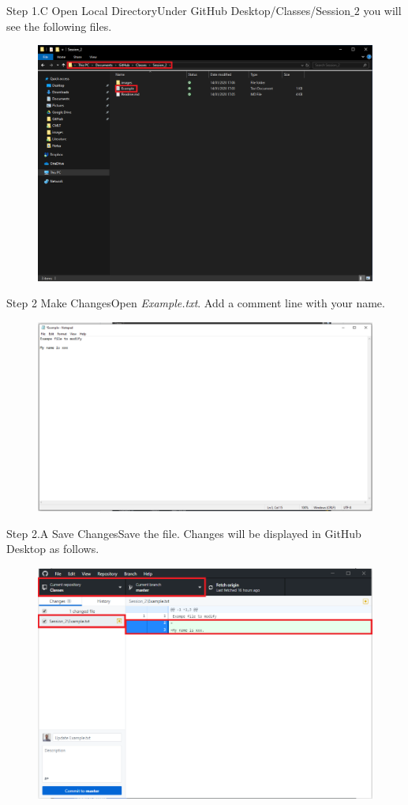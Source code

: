 \documentclass[aspectratio=169]{beamer}
\begin{document}
\begin{frame}{Step 1.C Open Local Directory}{Under GitHub Desktop/Classes/Session$\_2$ you will see the following files.}
	\begin{figure}
		\centering
		\includegraphics[width=0.7\linewidth]{../images/step1.C}
	\end{figure}
\end{frame}

\begin{frame}{Step 2 Make Changes}{Open \emph{Example.txt}. Add a comment line with your name.}
	\begin{figure}
		\centering
		\includegraphics[width=0.8\linewidth]{../images/step2}
	\end{figure}
\end{frame}

\begin{frame}{Step 2.A Save Changes}{Save the file. Changes will be displayed in GitHub Desktop as follows.}
	\begin{figure}
		\centering
		\includegraphics[width=0.7\linewidth]{../images/step2.A}
	\end{figure}
\end{frame}
\end{document}
